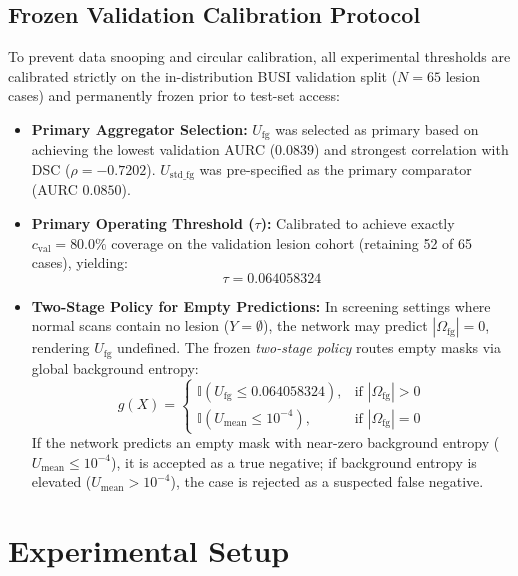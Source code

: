 \documentclass[10pt,journal,compsoc]{IEEEtran}
\begin{document}
\subsection{Frozen Validation Calibration Protocol}
\label{sec:two_stage}
To prevent data snooping and circular calibration, all experimental thresholds are calibrated strictly on the in-distribution BUSI validation split ($N=65$ lesion cases) and permanently frozen prior to test-set access:
\begin{itemize}
    \item \textbf{Primary Aggregator Selection:} $U_{\mathrm{fg}}$ was selected as primary based on achieving the lowest validation AURC ($0.0839$) and strongest correlation with DSC ($\rho = -0.7202$). $U_{\mathrm{std\_fg}}$ was pre-specified as the primary comparator (AURC $0.0850$).
    \item \textbf{Primary Operating Threshold ($\tau$):} Calibrated to achieve exactly $c_{\mathrm{val}} = 80.0\%$ coverage on the validation lesion cohort (retaining 52 of 65 cases), yielding:
    \begin{equation}
    \tau = 0.064058324
    \end{equation}
    \item \textbf{Two-Stage Policy for Empty Predictions:} In screening settings where normal scans contain no lesion ($Y = \emptyset$), the network may predict $|\Omega_{\mathrm{fg}}| = 0$, rendering $U_{\mathrm{fg}}$ undefined. The frozen \emph{two-stage policy} routes empty masks via global background entropy:
    \begin{equation}
    g(X) = \begin{cases}
    \mathbb{I}(U_{\mathrm{fg}} \le 0.064058324), & \text{if } |\Omega_{\mathrm{fg}}| > 0 \\
    \mathbb{I}(U_{\mathrm{mean}} \le 10^{-4}), & \text{if } |\Omega_{\mathrm{fg}}| = 0
    \end{cases}
    \end{equation}
    If the network predicts an empty mask with near-zero background entropy ($U_{\mathrm{mean}} \le 10^{-4}$), it is accepted as a true negative; if background entropy is elevated ($U_{\mathrm{mean}} > 10^{-4}$), the case is rejected as a suspected false negative.
\end{itemize}

\section{Experimental Setup}
\end{document}
